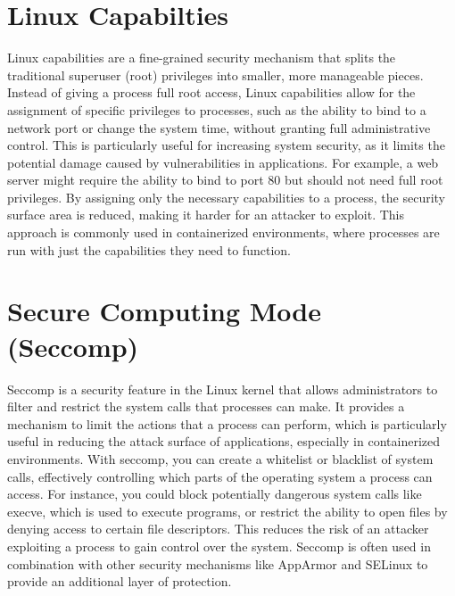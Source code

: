 \documentclass[12pt]{report}
\begin{document}
\begin{doublespace}
\section{Linux Capabilties}
Linux capabilities are a fine-grained security mechanism that splits the traditional superuser (root) privileges into smaller, more manageable pieces. Instead of giving a process full root access, Linux capabilities allow for the assignment of specific privileges to processes, such as the ability to bind to a network port or change the system time, without granting full administrative control. This is particularly useful for increasing system security, as it limits the potential damage caused by vulnerabilities in applications. For example, a web server might require the ability to bind to port 80 but should not need full root privileges. By assigning only the necessary capabilities to a process, the security surface area is reduced, making it harder for an attacker to exploit. This approach is commonly used in containerized environments, where processes are run with just the capabilities they need to function.

\section{Secure Computing Mode (Seccomp)}
Seccomp is a security feature in the Linux kernel that allows administrators to filter and restrict the system calls that processes can make. It provides a mechanism to limit the actions that a process can perform, which is particularly useful in reducing the attack surface of applications, especially in containerized environments. With seccomp, you can create a whitelist or blacklist of system calls, effectively controlling which parts of the operating system a process can access. For instance, you could block potentially dangerous system calls like execve, which is used to execute programs, or restrict the ability to open files by denying access to certain file descriptors. This reduces the risk of an attacker exploiting a process to gain control over the system. Seccomp is often used in combination with other security mechanisms like AppArmor and SELinux to provide an additional layer of protection.


\end{doublespace}
\end{document}
